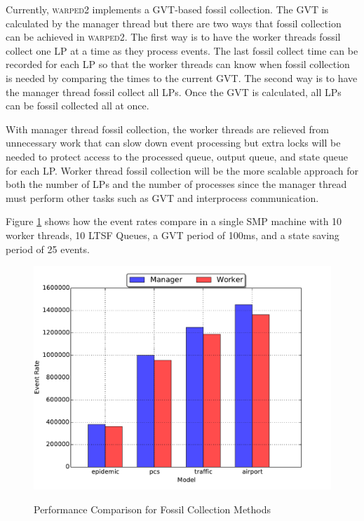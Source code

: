 \documentclass[11pt]{book}
\begin{document}
Currently, \textsc{warped2} implements a GVT-based fossil collection.  The GVT is calculated by
the manager thread but there are two ways that fossil collection can be achieved in \textsc{warped2}.
The first way is to have the worker threads fossil collect one LP at a time as they process events.
The last fossil collect time can be recorded for each LP so that the worker threads can know when fossil
collection is needed by comparing the times to the current GVT.  The second way is to have the
manager thread fossil collect all LPs.  Once the GVT is calculated, all LPs can be fossil collected
all at once.

With manager thread fossil collection, the worker threads are relieved from unnecessary work
that can slow down event processing but extra locks will be needed to protect access to the
processed queue, output queue, and state queue for each LP.  Worker thread fossil collection
will be the more scalable approach for both the number of LPs and the number of processes since
the manager thread must perform other tasks such as GVT and interprocess communication.

Figure \ref{fc_times} shows how the event rates compare in a single SMP machine with
10 worker threads, 10 LTSF Queues, a GVT period of 100ms, and a state saving period of 25 events.

\begin{figure}
  \centering
  \includegraphics[width=\textwidth,quiet]{figs/fossil_collection/event_rates.pdf}\\
  \caption{Performance Comparison for Fossil Collection Methods}\label{fc_times}
\end{figure}
\end{document}
